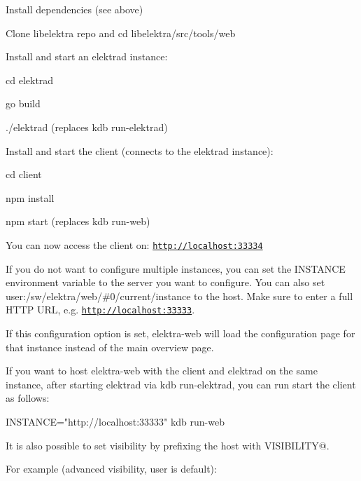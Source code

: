 \begin{DoxyItemize}
\item Install dependencies (see above)
\item Clone libelektra repo and {\ttfamily cd libelektra/src/tools/web}
\item Install and start an elektrad instance\+:
\begin{DoxyItemize}
\item {\ttfamily cd elektrad}
\item {\ttfamily go build}
\item {\ttfamily ./elektrad} (replaces {\ttfamily kdb run-\/elektrad})
\end{DoxyItemize}
\item Install and start the client (connects to the elektrad instance)\+:
\begin{DoxyItemize}
\item {\ttfamily cd client}
\item {\ttfamily npm install}
\item {\ttfamily npm start} (replaces {\ttfamily kdb run-\/web})
\end{DoxyItemize}
\item You can now access the client on\+: \href{http://localhost:33334}{\tt http\+://localhost\+:33334}
\end{DoxyItemize}

If you do not want to configure multiple instances, you can set the {\ttfamily I\+N\+S\+T\+A\+N\+CE} environment variable to the server you want to configure. You can also set {\ttfamily user\+:/sw/elektra/web/\#0/current/instance} to the host. Make sure to enter a full H\+T\+TP U\+RL, e.\+g. {\ttfamily \href{http://localhost:33333}{\tt http\+://localhost\+:33333}}.

If this configuration option is set, elektra-\/web will load the configuration page for that instance instead of the main overview page.

If you want to host elektra-\/web with the client and elektrad on the same instance, after starting elektrad via {\ttfamily kdb run-\/elektrad}, you can run start the client as follows\+:


\begin{DoxyCode}
INSTANCE="http://localhost:33333" kdb run-web
\end{DoxyCode}


It is also possible to set visibility by prefixing the host with {\ttfamily V\+I\+S\+I\+B\+I\+L\+I\+TY@}.

For example ({\ttfamily advanced} visibility, {\ttfamily user} is default)\+:


